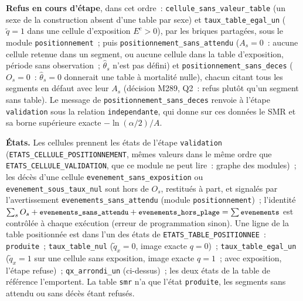 \documentclass[a4paper,11pt]{article}
\newcommand{\code}[1]{\texttt{\small #1}}
\begin{document}
\medskip
\textbf{Refus en cours d'étape}, dans cet ordre~:
\code{cellule\_sans\_valeur\_table} (un sexe de la construction absent
d'une table par sexe) et \code{taux\_table\_egal\_un} ($\tilde q = 1$ dans
une cellule d'exposition $E^c > 0$), par les briques partagées, sous le
module \code{positionnement}~; puis \code{positionnement\_sans\_attendu}
($A_s = 0$~: aucune cellule retenue dans un segment, ou aucune cellule dans
la table d'exposition, période sans observation~; $\hat\theta_s$ n'est pas
défini) et \code{positionnement\_sans\_deces} ($O_s = 0$~:
$\hat\theta_s = 0$ donnerait une table à mortalité nulle), chacun citant
tous les segments en défaut avec leur $A_s$ (décision M289, Q2~: refus
plutôt qu'un segment sans table). Le message de
\code{positionnement\_sans\_deces} renvoie à l'étape \code{validation}
sous la relation \code{independante}, qui donne sur ces données le SMR et
sa borne supérieure exacte $-\ln(\alpha/2)/A$.

\medskip
\noindent
\textbf{États.} Les cellules prennent les états de l'étape
\code{validation} (\code{ETATS\_CELLULE\_POSITIONNEMENT}, mêmes valeurs dans
le même ordre que \code{ETATS\_CELLULE\_VALIDATION}, que ce module ne peut
lire~: graphe des modules)~; les décès d'une cellule
\code{evenement\_sans\_exposition} ou \code{evenement\_sous\_taux\_nul}
sont hors de $O_s$, restitués à part, et signalés par l'avertissement
\code{evenements\_sans\_attendu} (module \code{positionnement})~; l'identité
$\sum_s O_s + \text{\code{evenements\_sans\_attendu}} +
\text{\code{evenements\_hors\_plage}} = \sum \text{\code{evenements}}$ est
contrôlée à chaque exécution (erreur de programmation sinon). Une ligne de
la table positionnée est dans l'un des états de
\code{ETATS\_TABLE\_POSITIONNEE}~: \code{produite}~;
\code{taux\_table\_nul} ($\tilde q_x = 0$, image exacte $q = 0$)~;
\code{taux\_table\_egal\_un} ($\tilde q_x = 1$ sur une cellule sans
exposition, image exacte $q = 1$~; avec exposition, l'étape refuse)~;
\code{qx\_arrondi\_un} (ci-dessus)~; les deux états de la table de
référence l'emportent. La table \code{smr} n'a que l'état
\code{produite}, les segments sans attendu ou sans décès étant refusés.
\end{document}
